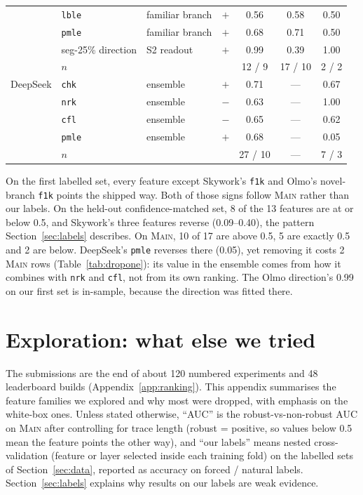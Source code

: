 \documentclass{article}
\newcommand{\stwo}{\textsc{S2}}
\begin{document}
\begin{table}[h]
\begin{tabular}{lllcccc}
 & \texttt{lble} & familiar branch & $+$ & 0.56 & 0.58 & 0.50 \\
 & \texttt{pmle} & familiar branch & $+$ & 0.68 & 0.71 & 0.50 \\
 & seg-25\% direction & \stwo{} readout & $+$ & 0.99 & 0.39 & 1.00 \\
 & \multicolumn{3}{l}{\quad $n$} & 12 / 9 & 17 / 10 & 2 / 2 \\
\midrule
DeepSeek & \texttt{chk} & ensemble & $+$ & 0.71 & --- & 0.67 \\
 & \texttt{nrk} & ensemble & $-$ & 0.63 & --- & 1.00 \\
 & \texttt{cfl} & ensemble & $-$ & 0.65 & --- & 0.62 \\
 & \texttt{pmle} & ensemble & $+$ & 0.68 & --- & 0.05 \\
 & \multicolumn{3}{l}{\quad $n$} & 27 / 10 & --- & 7 / 3 \\
\bottomrule
\end{tabular}
\end{table}
On the first labelled set, every feature except Skywork's \texttt{f1k} and Olmo's novel-branch \texttt{f1k} points the shipped way. Both of those signs follow \textsc{Main} rather than our labels. On the held-out confidence-matched set, 8 of the 13 features are at or below 0.5, and Skywork's three features reverse (0.09--0.40), the pattern Section~\ref{sec:labels} describes. On \textsc{Main}, 10 of 17 are above 0.5, 5 are exactly 0.5 and 2 are below. DeepSeek's \texttt{pmle} reverses there (0.05), yet removing it costs 2 \textsc{Main} rows (Table~\ref{tab:dropone}): its value in the ensemble comes from how it combines with \texttt{nrk} and \texttt{cfl}, not from its own ranking. The Olmo direction's 0.99 on our first set is in-sample, because the direction was fitted there.

\section{Exploration: what else we tried}
\label{app:explore}
The submissions are the end of about 120 numbered experiments and 48 leaderboard builds (Appendix~\ref{app:ranking}). This appendix summarises the feature families we explored and why most were dropped, with emphasis on the white-box ones. Unless stated otherwise, ``AUC'' is the robust-vs-non-robust AUC on \textsc{Main} after controlling for trace length (robust = positive, so values below 0.5 mean the feature points the other way), and ``our labels'' means nested cross-validation (feature or layer selected inside each training fold) on the labelled sets of Section~\ref{sec:data}, reported as accuracy on forced / natural labels. Section~\ref{sec:labels} explains why results on our labels are weak evidence.
\end{document}
